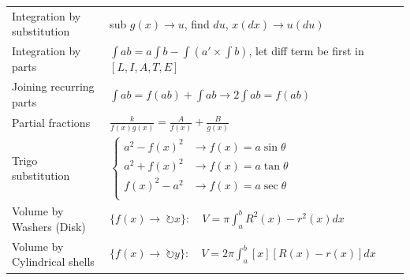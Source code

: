 \documentclass{article}
\begin{document}
\begin{tabular}{|l|l|}
    Integration by substitution         & sub $g(x)\to u$, find $du$, $x(dx)\to u(du)$                                                                                                                                                                                                                                                         \\
    Integration by parts                & $\int ab=a\int b-\int (a'\times \int b)$, let diff term be first in $[L, I, A, T, E]$                                                                                                                                                                                                                \\
    Joining recurring parts             & $\int ab=f(ab)+\int ab\to 2\int ab = f(ab)$                                                                                                                                                                                                                                                          \\
    Partial fractions                   & $\frac{k}{f(x)g(x)}=\frac{A}{f(x)}+\frac{B}{g(x)}$                                                                                                                                                                                                                                                   \\
    Trigo substitution                  & $\begin{cases}a^2-f(x)^2 & \to f(x)=a\sin\theta\\a^2+f(x)^2 & \to f(x)=a\tan\theta \\f(x)^2-a^2 & \to f(x)=a\sec\theta \\\end{cases}$                                                                                                                                                                \\
    Volume by Washers (Disk)            & $\{f(x)\to\ \circlearrowright x\}:\quad V=\pi\int_{a}^{b}R^2(x)-r^2(x)dx$                                                                                                                                                                                                                            \\
    Volume by Cylindrical shells        & $\{f(x)\to\ \circlearrowright y\}:\quad V=2\pi\int_{a}^{b}[x][R(x)-r(x)]dx$                                                                                                                                                                                                                          \\

\end{tabular}
\end{document}
